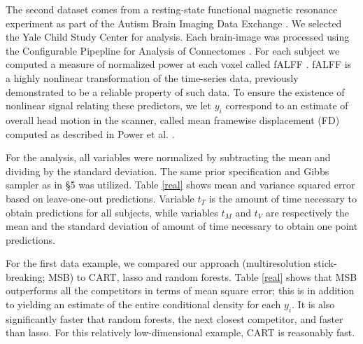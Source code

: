 \documentclass{article} %
\begin{document}
The second dataset comes from a resting-state functional magnetic resonance experiment as part of the Autism Brain Imaging Data Exchange \cite{Autism}.  We selected the Yale Child Study Center for analysis.  Each brain-image was processed using the Configurable Pipepline for Analysis of Connectomes \cite{cpac}. For each subject we computed a measure of normalized power at each voxel called fALFF \cite{Zou2008}.  fALFF is a highly nonlinear transformation of the time-series data, previously demonstrated to be a reliable property of such data.  To ensure the existence of nonlinear signal relating these predictors, we let $y_i$ correspond to an estimate of overall head motion in the scanner, called mean framewise displacement (FD) computed as described in Power et al. \cite{power}.


For the analysis, all variables were normalized by subtracting the mean and dividing by the standard deviation. The same prior specification and Gibbs sampler as in \S 5 was  utilized. Table \ref{real} shows mean and variance squared error based on leave-one-out predictions. Variable $t_{T}$ is the amount of time necessary to obtain predictions for all subjects, while variables $t_M$ and $t_V$ are respectively the mean and the standard deviation of amount of time necessary to obtain one point predictions.

For the first data example, we compared our approach (multiresolution stick-breaking; MSB) to CART, lasso and random forests. 
Table \ref{real} shows that MSB outperforms all the competitors in terms of mean square error; this is in addition to yielding an estimate of the entire conditional density for each $y_i$.  It is also significantly faster that random forests, the next closest competitor, and faster than lasso.  For this relatively low-dimensional example, CART is reasonably fast.  

 
\end{document}
